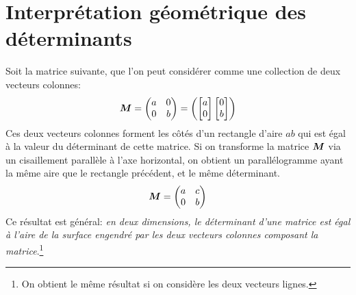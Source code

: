 \section{Interprétation géométrique des déterminants}\label{sec:det-geom}

Soit la matrice suivante, que l'on peut considérer comme une collection de deux
vecteurs colonnes:
\[
\boldsymbol{M} = \begin{pmatrix}
a & 0 \\
0 & b
\end{pmatrix} 
=
\begin{pmatrix}
\begin{bmatrix}
a \\ 0
\end{bmatrix}
\begin{bmatrix}
0 \\ b
\end{bmatrix}
\end{pmatrix}
\]
Ces deux vecteurs colonnes forment les côtés d'un rectangle d'aire $ab$ qui 
est égal à la valeur du déterminant de cette matrice.
Si on transforme la matrice $\boldsymbol{M}$ via un cisaillement
parallèle à l'axe horizontal, on obtient un parallélogramme ayant la même aire
que le rectangle précédent, et le même déterminant.
\[
\boldsymbol{M} = \begin{pmatrix}
a & c \\
0 & b
\end{pmatrix} 
\]
Ce résultat est général: \textit{en deux dimensions, le déterminant d'une matrice est 
égal à l'aire de la surface engendré par les deux vecteurs colonnes
composant la matrice}.\footnote{On obtient le même résultat si on considère les
deux vecteurs lignes.}
